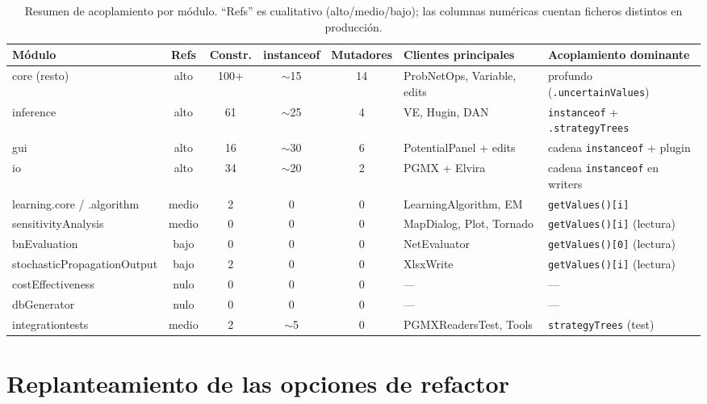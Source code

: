 \documentclass[11pt,a4paper]{article}
\newcommand{\code}[1]{\texttt{#1}}
\begin{document}
\begin{table}[H]
\centering
\scriptsize
\setlength{\tabcolsep}{3pt}
\begin{tabular}{lcccclp{4.2cm}}
\toprule
\textbf{Módulo} & \textbf{Refs} & \textbf{Constr.} &
\textbf{instanceof} & \textbf{Mutadores} & \textbf{Clientes principales} & \textbf{Acoplamiento dominante} \\
\midrule
core (resto)                 & alto  & 100+ & $\sim$15 & 14 & ProbNetOps, Variable, edits   & profundo (\code{.uncertainValues}) \\
inference                    & alto  &  61  & $\sim$25 &  4 & VE, Hugin, DAN                & \code{instanceof} + \code{.strategyTrees} \\
gui                          & alto  &  16  & $\sim$30 &  6 & PotentialPanel + edits        & cadena \code{instanceof} + plugin \\
io                           & alto  &  34  & $\sim$20 &  2 & PGMX + Elvira                 & cadena \code{instanceof} en writers \\
learning.core / .algorithm   & medio &   2  &    0     &  0 & LearningAlgorithm, EM         & \code{getValues()[i]} \\
sensitivityAnalysis          & medio &   0  &    0     &  0 & MapDialog, Plot, Tornado      & \code{getValues()[i]} (lectura) \\
bnEvaluation                 & bajo  &   0  &    0     &  0 & NetEvaluator                  & \code{getValues()[0]} (lectura) \\
stochasticPropagationOutput  & bajo  &   2  &    0     &  0 & XlsxWrite                     & \code{getValues()[i]} (lectura) \\
costEffectiveness            & nulo  &   0  &    0     &  0 & ---                           & --- \\
dbGenerator                  & nulo  &   0  &    0     &  0 & ---                           & --- \\
integrationtests             & medio &   2  & $\sim$5  &  0 & PGMXReadersTest, Tools        & \code{strategyTrees} (test) \\
\bottomrule
\end{tabular}
\caption{Resumen de acoplamiento por módulo. ``Refs'' es cualitativo
         (alto/medio/bajo); las columnas numéricas cuentan ficheros distintos
         en producción.}
\label{tab:acoplamiento}
\end{table}

\section{Replanteamiento de las opciones de refactor}
\end{document}
